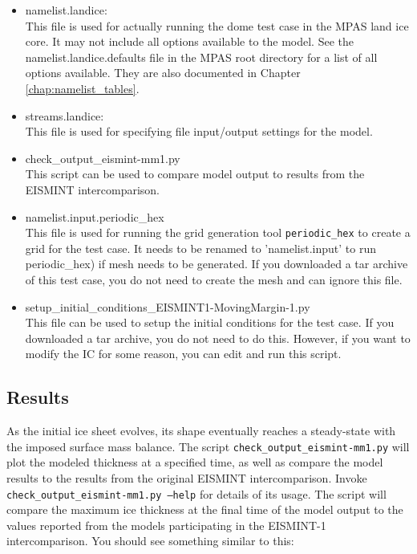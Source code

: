 \begin{itemize}
\item namelist.landice: \\
	This file is used for actually running the dome test case in the MPAS land ice core.  It may not include all options available to the model.  See the namelist.landice.defaults file in the MPAS root directory for a list of all options available.  They are also documented in Chapter \ref{chap:namelist_tables}.

\item streams.landice: \\
	This file is used for specifying file input/output settings for the model.

\item check\_output\_eismint-mm1.py \\
This script can be used to compare model output to results from the EISMINT intercomparison.

\item namelist.input.periodic\_hex \\
 This file is used for running the grid generation tool \texttt{periodic\_hex} to create a grid for the test case.  It needs to be renamed to 'namelist.input' to run periodic\_hex) if mesh needs to be generated.  If you downloaded a tar archive of this test case, you do not need to create the mesh and can ignore this file.

\item setup\_initial\_conditions\_EISMINT1-MovingMargin-1.py \\
This file can be used to setup the initial conditions for the test case.  If you downloaded a tar archive, you do not need to do this.  However, if you want to modify the IC for some reason, you can edit and run this script.

\end{itemize}

\subsection{Results}
\label{subsecc:eismint_results}
As the initial ice sheet evolves, its shape eventually reaches a steady-state with the imposed surface mass balance.  
The script \texttt{check\_output\_eismint-mm1.py} will plot the modeled thickness at a specified time, 
as well as compare the model results to the results from the original EISMINT intercomparison.  
Invoke \texttt{check\_output\_eismint-mm1.py --help} for details of its usage.  
The script will compare the maximum ice thickness at the final time of the model output 
to the values reported from the models participating in the EISMINT-1 intercomparison.  
You should see something similar to this:

